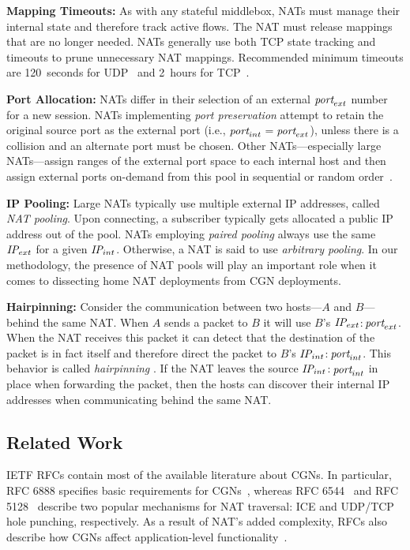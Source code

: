 \documentclass[10pt]{sig-alternate-05-2015}
\newcommand{\parax}[1]{\vspace{0.2em} \noindent \textbf{#1:}}
\newcommand{\privateipport}{$\text{\it IP}_{int}$$:$$\text{\it 
port}_{int}$\xspace}
\newcommand{\publicipport}{$\text{\it IP}_{ext}$$:$$\text{\it 
port}_{ext}$\xspace}
\newcommand{\privateport}{$\text{\it port}_{int}$\xspace}
\newcommand{\publicport}{$\text{\it port}_{ext}$\xspace}
\newcommand{\privateip}{$\text{\it IP}_{int}$\xspace}
\newcommand{\publicip}{$\text{\it IP}_{ext}$\xspace}
\begin{document}
\parax{Mapping Timeouts}
As with any stateful middlebox, NATs must manage their internal
state and therefore track active flows.  The NAT must release
mappings that are no longer needed.  NATs generally use both TCP
state tracking and timeouts to prune unnecessary NAT mappings.
Recommended minimum timeouts are 120~seconds for UDP~\cite{rfc4787}
and 2~hours for TCP~\cite{rfc5382}.

\parax{Port Allocation}
NATs differ in their selection of an external \publicport number for a
new session.  NATs implementing \textit{port preservation} attempt
to retain the original source port as the external port (i.e.,
\privateport$=$\publicport), unless there is a collision and an
alternate port must be chosen.  Other NATs---especially large
NATs---assign ranges of the external port space to each internal host
and then assign external ports on-demand from this pool in
sequential or random order~\cite{rfc4787}.

\parax{IP Pooling}
Large NATs typically use multiple external IP addresses, called
\textit{NAT pooling}. Upon connecting, a subscriber typically gets allocated a 
public IP address out of the pool. NATs employing \textit{paired pooling} always
use the same \publicip for a given \privateip.  Otherwise, a NAT is
said to use \textit{arbitrary pooling}. In our methodology, the presence of NAT 
pools will play an important role when it comes to dissecting home NAT 
deployments from CGN deployments.

\parax{Hairpinning}
Consider the communication between two hosts---$A$ and $B$---behind
the same NAT.  When $A$ sends a packet to $B$ it will use $B$'s
\publicipport.  When the NAT receives this packet it can detect that
the destination of the packet is in fact itself and therefore direct
the packet to $B$'s \privateipport.  This behavior is called
\textit{hairpinning} \cite{rfc4787,rfc5382}. If the NAT leaves the 
source \privateipport in place when forwarding the packet, then the hosts can 
discover their internal IP addresses when communicating behind the same NAT.



\subsection{Related Work}

IETF RFCs contain most of the available literature about CGNs. In particular, 
RFC 6888 specifies basic requirements for CGNs~\cite{rfc6888}, whereas
RFC 6544~\cite{rfc6544} and RFC 5128~\cite{rfc5128} describe two popular
mechanisms for NAT traversal: ICE and UDP/TCP hole punching, respectively.
As a result of NAT's added complexity, RFCs also
describe how CGNs affect application-level functionality~\cite{rfc5128,rfc7021}.
\end{document}

